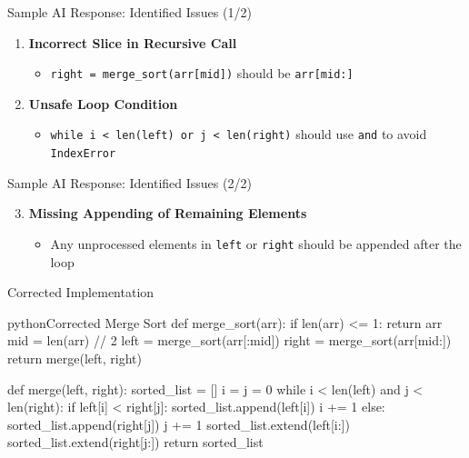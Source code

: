 \documentclass[xcolor=dvipsnames, aspectratio=169]{beamer}
\begin{document}
\begin{frame}{Sample AI Response: Identified Issues (1/2)}
  \begin{enumerate}
    \item \textbf{Incorrect Slice in Recursive Call}
      \begin{itemize}
        \item \texttt{right = merge\_sort(arr[mid])} should be \texttt{arr[mid:]}
      \end{itemize}
    
    \item \textbf{Unsafe Loop Condition}
      \begin{itemize}
        \item \texttt{while i < len(left) or j < len(right)} should use \texttt{and} to avoid \texttt{IndexError}
      \end{itemize}
  \end{enumerate}
\end{frame}

\begin{frame}{Sample AI Response: Identified Issues (2/2)}
  \begin{enumerate}\setcounter{enumi}{2}
    \item \textbf{Missing Appending of Remaining Elements}
      \begin{itemize}
        \item Any unprocessed elements in \texttt{left} or \texttt{right} should be appended after the loop
      \end{itemize}
  \end{enumerate}
\end{frame}

\begin{frame}[fragile]{Corrected Implementation}
  \begin{codeboxtc}{python}{Corrected Merge Sort}{}{}
def merge_sort(arr):
    if len(arr) <= 1:
        return arr
    mid = len(arr) // 2
    left = merge_sort(arr[:mid])
    right = merge_sort(arr[mid:])
    return merge(left, right)

def merge(left, right):
    sorted_list = []
    i = j = 0
    while i < len(left) and j < len(right):
        if left[i] < right[j]:
            sorted_list.append(left[i])
            i += 1
        else:
            sorted_list.append(right[j])
            j += 1
    sorted_list.extend(left[i:])
    sorted_list.extend(right[j:])
    return sorted_list
  \end{codeboxtc}
\end{frame}
\end{document}
